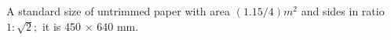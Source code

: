 A standard size of untrimmed paper with area $(1.15/4)m^{2}$  and sides in ratio
$ 1 : \sqrt{2} ; $ it is 450 \ensuremath{ \times } 640 mm.